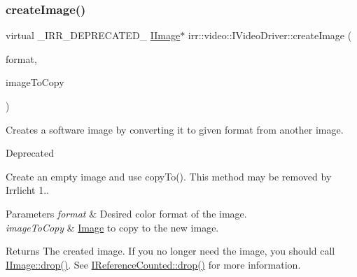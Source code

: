 \subsubsection{\texorpdfstring{create\+Image()}{createImage()}\hspace{0.1cm}{\footnotesize\ttfamily [4/8]}}
{\footnotesize\ttfamily virtual \+\_\+\+I\+R\+R\+\_\+\+D\+E\+P\+R\+E\+C\+A\+T\+E\+D\+\_\+ \hyperlink{classirr_1_1video_1_1IImage}{I\+Image}$\ast$ irr\+::video\+::\+I\+Video\+Driver\+::create\+Image (\begin{DoxyParamCaption}\item[{\hyperlink{namespaceirr_1_1video_a1d5e487888c32b1674a8f75116d829ed}{E\+C\+O\+L\+O\+R\+\_\+\+F\+O\+R\+M\+AT}}]{format,  }\item[{\hyperlink{classirr_1_1video_1_1IImage}{I\+Image} $\ast$}]{image\+To\+Copy }\end{DoxyParamCaption})\hspace{0.3cm}{\ttfamily [pure virtual]}}



Creates a software image by converting it to given format from another image. 

\begin{DoxyRefDesc}{Deprecated}
\item[\hyperlink{deprecated__deprecated000049}{Deprecated}]Create an empty image and use copy\+To(). This method may be removed by Irrlicht 1.. \end{DoxyRefDesc}

\begin{DoxyParams}{Parameters}
{\em format} & Desired color format of the image. \\
\hline
{\em image\+To\+Copy} & \hyperlink{classImage}{Image} to copy to the new image. \\
\hline
\end{DoxyParams}
\begin{DoxyReturn}{Returns}
The created image. If you no longer need the image, you should call \hyperlink{classirr_1_1IReferenceCounted_a03856a09355b89d178090c4a5f738543}{I\+Image\+::drop()}. See \hyperlink{classirr_1_1IReferenceCounted_a03856a09355b89d178090c4a5f738543}{I\+Reference\+Counted\+::drop()} for more information. 
\end{DoxyReturn}
\mbox{\label{classirr_1_1video_1_1IVideoDriver_aa06059abf33e473d7af77e1fbc2b0f75}} 

